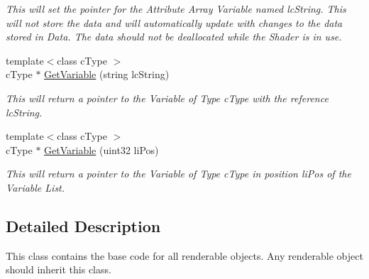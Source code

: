 \begin{DoxyCompactItemize}
\begin{DoxyCompactList}\small\item\em This will set the pointer for the Attribute Array Variable named lcString. This will not store the data and will automatically update with changes to the data stored in Data. The data should not be deallocated while the Shader is in use. \end{DoxyCompactList}\item 
\hypertarget{classc_render_object_a2ef2b6f9daee8fe9c8f9c9cd65f4fea4}{
{\footnotesize template$<$class cType $>$ }\\cType $\ast$ \hyperlink{classc_render_object_a2ef2b6f9daee8fe9c8f9c9cd65f4fea4}{GetVariable} (string lcString)}
\label{classc_render_object_a2ef2b6f9daee8fe9c8f9c9cd65f4fea4}

\begin{DoxyCompactList}\small\item\em This will return a pointer to the Variable of Type cType with the reference lcString. \end{DoxyCompactList}\item 
\hypertarget{classc_render_object_a1a10a22c158e96f72a8971ae52f69f38}{
{\footnotesize template$<$class cType $>$ }\\cType $\ast$ \hyperlink{classc_render_object_a1a10a22c158e96f72a8971ae52f69f38}{GetVariable} (uint32 liPos)}
\label{classc_render_object_a1a10a22c158e96f72a8971ae52f69f38}

\begin{DoxyCompactList}\small\item\em This will return a pointer to the Variable of Type cType in position liPos of the Variable List. \end{DoxyCompactList}\end{DoxyCompactItemize}


\subsection{Detailed Description}
This class contains the base code for all renderable objects. Any renderable object should inherit this class. 


